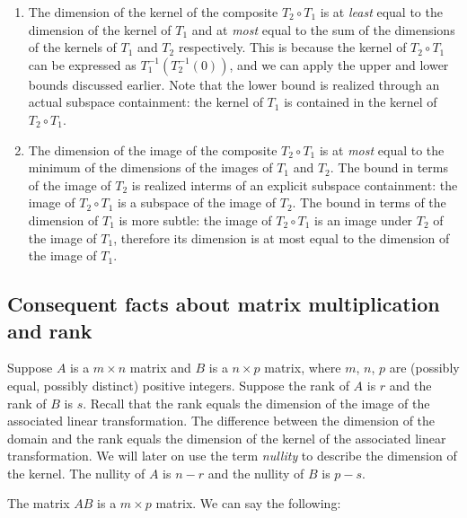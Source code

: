 \documentclass[10pt]{amsart}
\begin{document}
\begin{enumerate}
\item The dimension of the kernel of the composite $T_2 \circ T_1$ is
  at {\em least} equal to the dimension of the kernel of $T_1$ and at
  {\em most} equal to the sum of the dimensions of the kernels of
  $T_1$ and $T_2$ respectively. This is because the kernel of $T_2
  \circ T_1$ can be expressed as $T_1^{-1}(T_2^{-1}(0))$, and we can
  apply the upper and lower bounds discussed earlier. Note that the
  lower bound is realized through an actual subspace containment: the
  kernel of $T_1$ is contained in the kernel of $T_2 \circ T_1$.
\item The dimension of the image of the composite $T_2 \circ T_1$ is
  at {\em most} equal to the minimum of the dimensions of the images
  of $T_1$ and $T_2$. The bound in terms of the image of $T_2$ is
  realized interms of an explicit subspace containment: the image of
  $T_2 \circ T_1$ is a subspace of the image of $T_2$. The bound in
  terms of the dimension of $T_1$ is more subtle: the image of $T_2
  \circ T_1$ is an image under $T_2$ of the image of $T_1$, therefore
  its dimension is at most equal to the dimension of the image of
  $T_1$.
\end{enumerate}

\subsection{Consequent facts about matrix multiplication and rank}

Suppose $A$ is a $m \times n$ matrix and $B$ is a $n \times p$ matrix,
where $m$, $n$, $p$ are (possibly equal, possibly distinct) positive
integers. Suppose the rank of $A$ is $r$ and the rank of $B$ is
$s$. Recall that the rank equals the dimension of the image of the
associated linear transformation. The difference between the dimension
of the domain and the rank equals the dimension of the kernel of the
associated linear transformation. We will later on use the term {\em
  nullity} to describe the dimension of the kernel. The nullity of $A$
is $n - r$ and the nullity of $B$ is $p - s$.

The matrix $AB$ is a $m \times p$ matrix. We can say the following:
\end{document}
